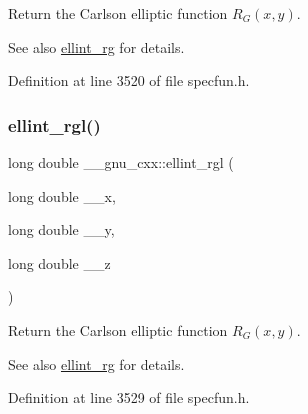 Return the Carlson elliptic function $ R_G(x,y) $.

\begin{DoxySeeAlso}{See also}
\hyperlink{group__mathsf__gnu_gadf618529d6106c1c1bc1e9212c4fed12}{ellint\+\_\+rg} for details. 
\end{DoxySeeAlso}


Definition at line 3520 of file specfun.\+h.

\mbox{\label{group__mathsf__gnu_ga563455d515ed845988552432108a21be}} 
\subsubsection{\texorpdfstring{ellint\+\_\+rgl()}{ellint\_rgl()}}
{\footnotesize\ttfamily long double \+\_\+\+\_\+gnu\+\_\+cxx\+::ellint\+\_\+rgl (\begin{DoxyParamCaption}\item[{long double}]{\+\_\+\+\_\+x,  }\item[{long double}]{\+\_\+\+\_\+y,  }\item[{long double}]{\+\_\+\+\_\+z }\end{DoxyParamCaption})\hspace{0.3cm}{\ttfamily [inline]}}

Return the Carlson elliptic function $ R_G(x,y) $.

\begin{DoxySeeAlso}{See also}
\hyperlink{group__mathsf__gnu_gadf618529d6106c1c1bc1e9212c4fed12}{ellint\+\_\+rg} for details. 
\end{DoxySeeAlso}


Definition at line 3529 of file specfun.\+h.

\mbox{\label{group__mathsf__gnu_gadccabc8df929cc03745286ed1574a3ba}} 
